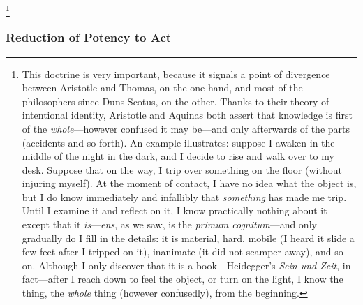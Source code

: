 \footnote{This doctrine is very important, because it signals a point of divergence between Aristotle and Thomas, on the one hand, and most of the philosophers since Duns Scotus, on the other. Thanks to their theory of intentional identity, Aristotle and Aquinas both assert that knowledge is first of the \emph{whole}---however confused it may be---and only afterwards of the parts (accidents and so forth). An example illustrates: suppose I awaken in the middle of the night in the dark, and I decide to rise and walk over to my desk. Suppose that on the way, I trip over something on the floor (without injuring myself). At the moment of contact, I have no idea what the object is, but I do know immediately and infallibly that \emph{something} has made me trip. Until I examine it and reflect on it, I know practically nothing about it except that it \emph{is}---\emph{ens}, as we saw, is the \emph{primum cognitum}---and only gradually do I fill in the details: it is material, hard, mobile (I heard it slide a few feet after I tripped on it), inanimate (it did not scamper away), and so on. Although I only discover that it is a book---Heidegger's \emph{Sein und Zeit}, in fact---after I reach down to feel the object, or turn on the light, I know the thing, the \emph{whole} thing (however confusedly), from the beginning.}

\subsubsection{Reduction of Potency to Act}
\label{sec:reduction}

